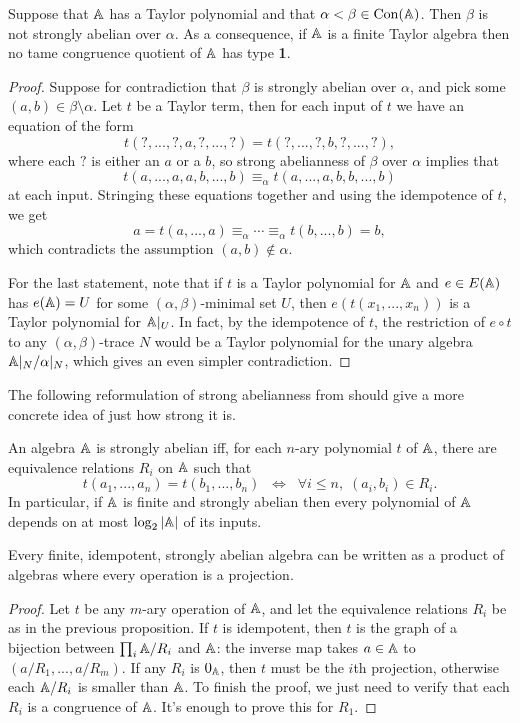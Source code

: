 \begin{appendices}
\begin{prop} Suppose that $\mathbb{A}$ has a Taylor polynomial and that $\alpha < \beta \in \operatorname{Con}(\mathbb{A})$. Then $\beta$ is not strongly abelian over $\alpha$. As a consequence, if $\mathbb{A}$ is a finite Taylor algebra then no tame congruence quotient of $\mathbb{A}$ has type \textbf{1}.
\end{prop}
\begin{proof} Suppose for contradiction that $\beta$ is strongly abelian over $\alpha$, and pick some $(a,b) \in \beta\setminus\alpha$. Let $t$ be a Taylor term, then for each input of $t$ we have an equation of the form
\[
t(?, ..., ?, a, ?, ..., ?) = t(?, ..., ?, b, ?, ..., ?),
\]
where each $?$ is either an $a$ or a $b$, so strong abelianness of $\beta$ over $\alpha$ implies that
\[
t(a,...,a,a,b,...,b) \equiv_\alpha t(a,...,a,b,b,...,b)
\]
at each input. Stringing these equations together and using the idempotence of $t$, we get
\[
a = t(a,...,a) \equiv_\alpha \cdots \equiv_\alpha t(b,...,b) = b,
\]
which contradicts the assumption $(a,b) \not\in \alpha$.

For the last statement, note that if $t$ is a Taylor polynomial for $\mathbb{A}$ and $e \in E(\mathbb{A})$ has $e(\mathbb{A}) = U$ for some $(\alpha,\beta)$-minimal set $U$, then $e(t(x_1, ..., x_n))$ is a Taylor polynomial for $\mathbb{A}|_U$. In fact, by the idempotence of $t$, the restriction of $e\circ t$ to any $(\alpha,\beta)$-trace $N$ would be a Taylor polynomial for the unary algebra $\mathbb{A}|_N/\alpha|_N$, which gives an even simpler contradiction.
\end{proof}

The following reformulation of strong abelianness from \cite{finite-forbidden-lattices} should give a more concrete idea of just how strong it is.

\begin{prop} An algebra $\mathbb{A}$ is strongly abelian iff, for each $n$-ary polynomial $t$ of $\mathbb{A}$, there are equivalence relations $R_i$ on $\mathbb{A}$ such that
\[
t(a_1, ..., a_n) = t(b_1, ..., b_n) \;\; \iff \;\; \forall i \le n, \; (a_i, b_i) \in R_i.
\]
In particular, if $\mathbb{A}$ is finite and strongly abelian then every polynomial of $\mathbb{A}$ depends on at most $\log_2|\mathbb{A}|$ of its inputs.
\end{prop}

\begin{cor} Every finite, idempotent, strongly abelian algebra can be written as a product of algebras where every operation is a projection.
\end{cor}
\begin{proof} Let $t$ be any $m$-ary operation of $\mathbb{A}$, and let the equivalence relations $R_i$ be as in the previous proposition. If $t$ is idempotent, then $t$ is the graph of a bijection between $\prod_i \mathbb{A}/R_i$ and $\mathbb{A}$: the inverse map takes $a \in \mathbb{A}$ to $(a/R_1, ..., a/R_m)$. If any $R_i$ is $0_{\mathbb{A}}$, then $t$ must be the $i$th projection, otherwise each $\mathbb{A}/R_i$ is smaller than $\mathbb{A}$. To finish the proof, we just need to verify that each $R_i$ is a congruence of $\mathbb{A}$. It's enough to prove this for $R_1$.


\end{proof}
\end{appendices}
